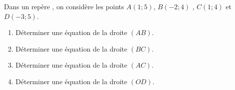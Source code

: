 
Dans un repère \Oij, on considère les points $A(1;5)$, $B(-2;4)$  , $C(1;4)$  et  $D(-3;5)$.
\begin{enumerate}
\item Déterminer une équation de la droite $(AB)$.
\item  Déterminer une équation de la droite $(BC)$.
\item  Déterminer une équation de la droite $(AC)$.
\item  Déterminer une équation de la droite $(OD)$.
\end{enumerate}